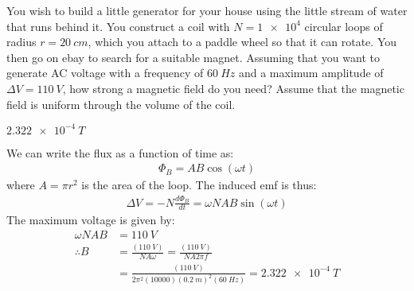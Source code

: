 \question You wish to build a little generator for your house using the little stream of water that runs behind it. You construct a coil with $N=\num{1e4}$ circular loops of radius $r=\SI{20}{cm}$, which you attach to a paddle wheel so that it can rotate. You then go on ebay to search for a suitable magnet. Assuming that you want to generate AC voltage with a frequency of $\SI{60}{Hz}$ and a maximum amplitude of $\Delta V=\SI{110}{V}$, how strong a magnetic field do you need? Assume that the magnetic field is uniform through the volume of the coil. 
\begin{finalanswer}
	$\SI{2.322e-4}{T}$
\end{finalanswer}
\begin{solution}
	We can write the flux as a function of time as:
	\begin{align*}
	\Phi_B = AB\cos(\omega t)
	\end{align*}
	where $A=\pi r^2$ is the area of the loop. The induced emf is thus:
	\begin{align*}
	\Delta V = -N\frac{d\Phi_B}{dt}=\omega NAB \sin(\omega t)
	\end{align*}
	The maximum voltage is given by:
	\begin{align*}
	\omega  NAB &= \SI{110}{V}\\
	\therefore B&=\frac{(\SI{110}{V})}{NA\omega}=\frac{(\SI{110}{V})}{NA2\pi f}\\
	&=\frac{(\SI{110}{V})}{2\pi^2(10000)(\SI{0.2}{m})^2(\SI{60}{Hz})}=\SI{2.322e-4}{T}
	\end{align*}
	
\end{solution}
